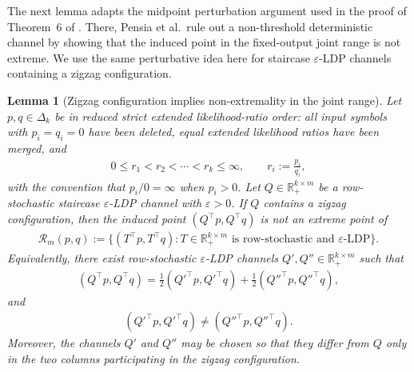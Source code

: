 \documentclass{article}
\theoremstyle{plain}
\newtheorem{lemma}[theorem]{Lemma}
\theoremstyle{definition}
\theoremstyle{plain}
\begin{document}
The next lemma adapts the midpoint perturbation argument used in the proof of Theorem~6 of \cite{Pensia2025BinaryTesting}. There, Pensia et al.\ rule out a non-threshold deterministic channel by showing that the induced point in the fixed-output joint range is not extreme. We use the same perturbative idea here for staircase $\varepsilon$-LDP channels containing a zigzag configuration.

\begin{lemma}[Zigzag configuration implies non-extremality in the joint range]
\label{lemma:zigzag-implies-non-extremality}
Let $p,q \in \Delta_k$ be in reduced strict extended likelihood-ratio order: all input symbols with $p_i=q_i=0$ have been deleted, equal extended likelihood ratios have been merged, and
\begin{align*}
    0\le r_1<r_2<\cdots<r_k\le \infty,
    \qquad
    r_i:=\frac{p_i}{q_i},
\end{align*}
with the convention that $p_i/0=\infty$ when $p_i>0$.
Let $Q \in \mathbb{R}_+^{k\times m}$ be a row-stochastic staircase $\varepsilon$-LDP channel with $\varepsilon>0$. If $Q$ contains a zigzag configuration, then the induced point $(Q^\top p,Q^\top q)$ is not an extreme point of
\begin{align*}
    \mathcal{R}_m(p,q)
    :=
    \{(T^\top p,T^\top q):
    T\in\mathbb{R}_+^{k\times m}
    \text{ is row-stochastic and }\varepsilon\text{-LDP}\}.
\end{align*}
Equivalently, there exist row-stochastic $\varepsilon$-LDP channels $Q',Q''\in\mathbb{R}_+^{k\times m}$ such that
\begin{align*}
    (Q^\top p,Q^\top q)
    =
    \tfrac12(Q'^\top p,Q'^\top q)
    +
    \tfrac12(Q''^\top p,Q''^\top q),
\end{align*}
and
\begin{align*}
    (Q'^\top p,Q'^\top q)\neq (Q''^\top p,Q''^\top q).
\end{align*}
Moreover, the channels $Q'$ and $Q''$ may be chosen so that they differ from $Q$ only in the two columns participating in the zigzag configuration.
\end{lemma}
\end{document}
